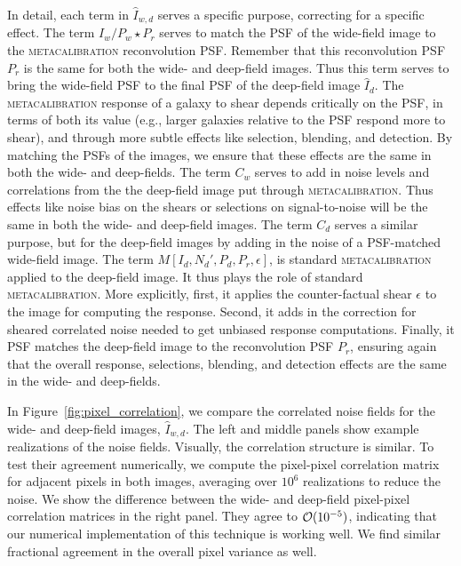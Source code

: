 \documentclass[twocolumn]{openjournal}
\makeatletter
\newcommand{\mcal}{\textsc{metacalibration}\@\xspace}
\makeatother
\begin{document}
In detail, each term in $\hat I_{w,d}$ serves a specific purpose, correcting for a
specific effect. The term $I_{w}/P_{w} \star P_{r}$ serves to match the PSF of the
wide-field image to the \mcal reconvolution PSF. Remember that this reconvolution PSF
$P_r$ is the same for both the wide- and deep-field images. Thus this term serves to
bring the wide-field PSF to the final PSF of the deep-field image $\hat I_{d}$. The
\mcal response of a galaxy to shear depends critically on the PSF, in terms of both its
value (e.g., larger galaxies relative to the PSF respond more to shear), and through
more subtle effects like selection, blending, and detection. By matching the PSFs of the
images, we ensure that these effects are the same in both the wide- and deep-fields. The
term $C_{w}$ serves to add in noise levels and correlations from the the deep-field
image put through \mcal. Thus effects like noise bias on the shears or selections on
signal-to-noise will be the same in both the wide- and deep-field images. The term
$C_{d}$ serves a similar purpose, but for the deep-field images by adding in the noise
of a PSF-matched wide-field image. The term $M[I_{d}, N_{d}', P_{d}, P_{r}, \epsilon]$, is
standard \mcal applied to the deep-field image. It thus plays the role of standard
\mcal. More explicitly, first, it applies the counter-factual shear $\epsilon$ to the
image for computing the response. Second, it adds in the correction for sheared
correlated noise needed to get unbiased response computations. Finally, it PSF matches
the deep-field image to the reconvolution PSF $P_{r}$, ensuring again that the overall
response, selections, blending, and detection effects are the same in the wide- and
deep-fields.

In Figure~\ref{fig:pixel_correlation}, we compare the correlated noise fields for the
wide- and deep-field images, $\hat I_{w,d}$. The left and middle panels show example
realizations of the noise fields. Visually, the correlation structure is similar. To
test their agreement numerically, we compute the pixel-pixel correlation matrix for
adjacent pixels in both images, averaging over $10^6$ realizations to reduce the noise.
We show the difference between the wide- and deep-field pixel-pixel correlation matrices
in the right panel. They agree to ${\cal O}(10^{-5})$, indicating that our numerical
implementation of this technique is working well. We find similar fractional agreement
in the overall pixel variance as well.
\end{document}
